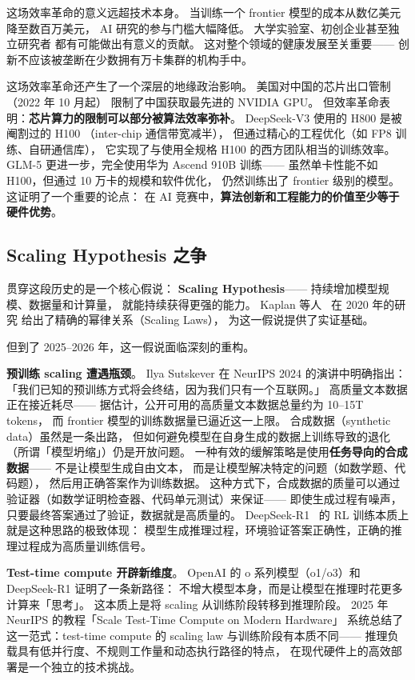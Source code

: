 这场效率革命的意义远超技术本身。
当训练一个 frontier 模型的成本从数亿美元降至数百万美元，
AI 研究的参与门槛大幅降低。
大学实验室、初创企业甚至独立研究者
都有可能做出有意义的贡献。
这对整个领域的健康发展至关重要——
创新不应该被垄断在少数拥有万卡集群的机构手中。

这场效率革命还产生了一个深层的地缘政治影响。
美国对中国的芯片出口管制（2022 年 10 月起）
限制了中国获取最先进的 NVIDIA GPU。
但效率革命表明：\textbf{芯片算力的限制可以部分被算法效率弥补}。
DeepSeek-V3 使用的 H800 是被阉割过的 H100
（inter-chip 通信带宽减半），
但通过精心的工程优化（如 FP8 训练、自研通信库），
它实现了与使用全规格 H100 的西方团队相当的训练效率。
GLM-5 更进一步，完全使用华为 Ascend 910B 训练——
虽然单卡性能不如 H100，但通过 10 万卡的规模和软件优化，
仍然训练出了 frontier 级别的模型。
这证明了一个重要的论点：
在 AI 竞赛中，\textbf{算法创新和工程能力的价值至少等于硬件优势}。

\subsection{Scaling Hypothesis 之争}

贯穿这段历史的是一个核心假说：
\textbf{Scaling Hypothesis}——
持续增加模型规模、数据量和计算量，
就能持续获得更强的能力。
Kaplan 等人~\cite{kaplan2020scaling} 在 2020 年的研究
给出了精确的幂律关系（Scaling Laws），
为这一假说提供了实证基础。

但到了 2025--2026 年，这一假说面临深刻的重构。

\textbf{预训练 scaling 遭遇瓶颈}。
Ilya Sutskever 在 NeurIPS 2024 的演讲中明确指出：
「我们已知的预训练方式将会终结，因为我们只有一个互联网。」
高质量文本数据正在接近耗尽——
据估计，公开可用的高质量文本数据总量约为 10--15T tokens，
而 frontier 模型的训练数据量已逼近这一上限。
合成数据（synthetic data）虽然是一条出路，
但如何避免模型在自身生成的数据上训练导致的退化
（所谓「模型坍缩」）仍是开放问题。
一种有效的缓解策略是使用\textbf{任务导向的合成数据}——
不是让模型生成自由文本，
而是让模型解决特定的问题（如数学题、代码题），
然后用正确答案作为训练数据。
这种方式下，合成数据的质量可以通过验证器（如数学证明检查器、代码单元测试）来保证——
即使生成过程有噪声，只要最终答案通过了验证，数据就是高质量的。
DeepSeek-R1~\cite{deepseekr1} 的 RL 训练本质上就是这种思路的极致体现：
模型生成推理过程，环境验证答案正确性，正确的推理过程成为高质量训练信号。

\textbf{Test-time compute 开辟新维度}。
OpenAI 的 o 系列模型（o1/o3）和 DeepSeek-R1 证明了一条新路径：
不增大模型本身，而是让模型在推理时花更多计算来「思考」。
这本质上是将 scaling 从训练阶段转移到推理阶段。
2025 年 NeurIPS 的教程「Scale Test-Time Compute on Modern Hardware」
系统总结了这一范式：test-time compute 的 scaling law
与训练阶段有本质不同——
推理负载具有低并行度、不规则工作量和动态执行路径的特点，
在现代硬件上的高效部署是一个独立的技术挑战。

